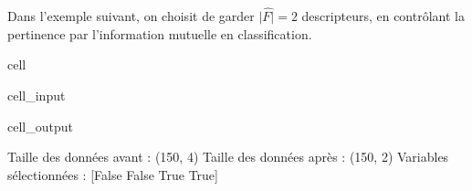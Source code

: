 \documentclass[letterpaper,10pt,english]{jupyterBook}
\begin{document}
\sphinxAtStartPar
Dans l’exemple suivant, on choisit de garder \(|\hat{F|}=2\) descripteurs, en contrôlant la pertinence par l’information mutuelle en classification.

\begin{sphinxuseclass}{cell}\begin{sphinxVerbatimInput}

\begin{sphinxuseclass}{cell_input}
\begin{sphinxVerbatim}[commandchars=\\\{\}]
   
   
   
   
  
   
 
\end{sphinxVerbatim}

\end{sphinxuseclass}\end{sphinxVerbatimInput}
\begin{sphinxVerbatimOutput}

\begin{sphinxuseclass}{cell_output}
\begin{sphinxVerbatim}[commandchars=\\\{\}]
Taille des données avant :  (150, 4)
Taille des données après :  (150, 2)
Variables sélectionnées :  [False False  True  True]
\end{sphinxVerbatim}

\end{sphinxuseclass}\end{sphinxVerbatimOutput}

\end{sphinxuseclass}
\end{document}
